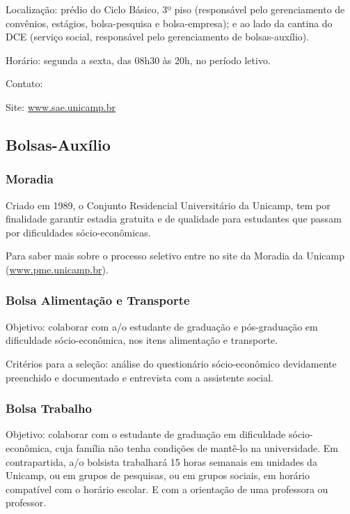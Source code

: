 \begin{compactitemize}
\item Localização: prédio do Ciclo Básico, 3º piso (responsável pelo
  gerenciamento de convênios, estágios, bolsa-pesquisa e bolsa-empresa); e ao
  lado da cantina do DCE (serviço social, responsável pelo gerenciamento de
  bolsas-auxílio).
\item Horário: segunda a sexta, das 08h30 às 20h, no período letivo.
\item Contato: 
\item Site: \url{www.sae.unicamp.br}
\end{compactitemize}

\subsection{Bolsas-Auxílio}
\subsubsection{Moradia}

Criado em 1989, o Conjunto Residencial Universitário da Unicamp, tem por
finalidade garantir estadia gratuita e de qualidade para estudantes que passam
por dificuldades sócio-econômicas.

Para saber mais sobre o processo seletivo entre no site da Moradia da Unicamp
(\url{www.pme.unicamp.br}).

\subsubsection{Bolsa Alimentação e Transporte}

Objetivo: colaborar com a/o estudante de graduação e pós-graduação em
dificuldade só\-cio-\-e\-co\-nô\-mi\-ca, nos itens alimentação e transporte.

Critérios para a seleção: análise do questionário só\-cio-\-e\-co\-nô\-mi\-co
devidamente preenchido e documentado e entrevista com a assistente social.

\subsubsection{Bolsa Trabalho}

Objetivo: colaborar com o estudante de graduação em dificuldade
sócio-econômica, cuja família não tenha condições de mantê-lo na universidade.
Em contrapartida, a/o bolsista trabalhará 15 horas semanais em unidades da
Unicamp, ou em grupos de pesquisas, ou em grupos sociais, em horário compatível
com o horário escolar. E com a orientação de uma professora ou professor.

